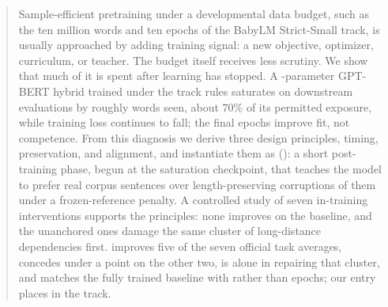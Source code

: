 \begin{abstract}
Sample-efficient pretraining under a developmental data budget, such as
the ten million words and ten epochs of the BabyLM Strict-Small track, is
usually approached by adding training signal: a new objective, optimizer,
curriculum, or teacher. The budget itself receives less scrutiny. We show
that much of it is spent after learning has stopped. A
\rParamsM{}-parameter GPT-BERT hybrid trained under the track rules
saturates on downstream evaluations by roughly \rPeakCkpt{} words seen,
about $70\%$ of its permitted exposure, while training loss continues to
fall; the final epochs improve fit, not competence. From this diagnosis we
derive three design principles, timing, preservation, and alignment, and
instantiate them as \emph{\MPOlong{}} (\MPO{}): a short post-training
phase, begun at the saturation checkpoint, that teaches the model to
prefer real corpus sentences over length-preserving corruptions of them
under a frozen-reference penalty. A controlled study of seven in-training
interventions supports the principles: none improves on the baseline, and
the unanchored ones damage the same cluster of long-distance dependencies
first. \MPO{} improves five of the seven official task averages, concedes
under a point on the other two, is alone in repairing that cluster, and
matches the fully trained baseline with \rDpoEpochs{} rather than
\rEpochs{} epochs; our \MPO{} entry places \rRankDpo{} in the track.
\end{abstract}
